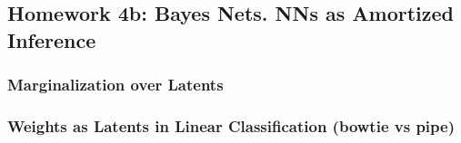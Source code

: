 \subsection*{Homework 4b: Bayes Nets.  NNs as Amortized Inference}


\subsubsection*{Marginalization over Latents}
\blurb{}

\blurb{}

\blurb{}

\blurb{}

\blurb{}


\subsubsection*{Weights as Latents in Linear Classification (bowtie vs pipe)}

\blurb{}

\blurb{}

\blurb{}

\blurb{}

\blurb{}

